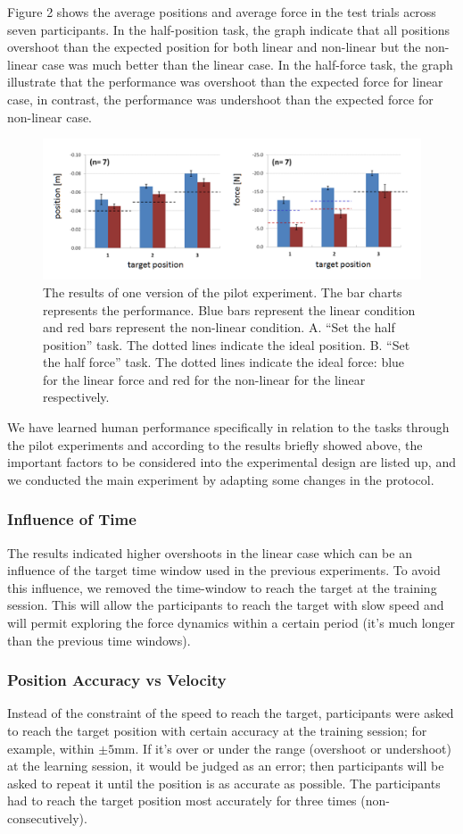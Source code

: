 Figure 2 shows the average positions and average force in the test trials across seven participants. In the half-position task, the graph indicate that all positions overshoot than the expected position for both linear and non-linear but the non-linear case was much better than the linear case. In the half-force task, the graph illustrate that the performance was overshoot than the expected force for linear case, in contrast, the performance was undershoot than the expected force for non-linear case.

\begin{figure}
	\centering
	\includegraphics[width=.7\textwidth]{Chie/figs/Figure2.png}
	\caption{The results of one version of the pilot experiment. The bar charts represents the performance. Blue bars represent the linear condition and red bars represent the non-linear condition. A. “Set the half position” task. The dotted lines indicate the ideal position. B. “Set the half force” task. The dotted lines indicate the ideal force: blue for the linear force and red for the non-linear for the linear respectively.}
	\label{pilot}
\end{figure}
We have learned human performance specifically in relation to the tasks through the pilot experiments and according to the results briefly showed above, the important factors to be considered into the experimental design are listed up, and we conducted the main experiment by adapting some changes in the protocol. 

\subsubsection{Influence of Time} 
The results indicated higher overshoots in the linear case which can be an influence of the target time window used in the previous experiments. To avoid this influence, we removed the time-window to reach the target at the training session. This will allow the participants to reach the target with slow speed and will permit exploring the force dynamics within a certain period (it’s much longer than the previous time windows).

\subsubsection{Position Accuracy vs Velocity} 
Instead of the constraint of the speed to reach the target, participants were asked to reach the target position with certain accuracy at the training session; for example, within $\pm 5$mm. If it’s over or under the range (overshoot or undershoot) at the learning session, it would be judged as an error; then participants will be asked to repeat it until the position is as accurate as possible. The participants had to reach the target position most accurately for three times (non-consecutively).

